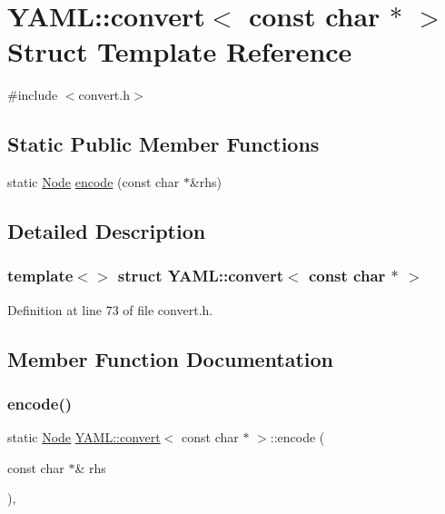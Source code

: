 \hypertarget{struct_y_a_m_l_1_1convert_3_01const_01char_01_5_01_4}{}\section{Y\+A\+ML\+::convert$<$ const char $\ast$ $>$ Struct Template Reference}
\label{struct_y_a_m_l_1_1convert_3_01const_01char_01_5_01_4}


{\ttfamily \#include $<$convert.\+h$>$}

\subsection*{Static Public Member Functions}
\begin{DoxyCompactItemize}
\item 
static \mbox{\hyperlink{class_y_a_m_l_1_1_node}{Node}} \mbox{\hyperlink{struct_y_a_m_l_1_1convert_3_01const_01char_01_5_01_4_ac71e377d0d029cf3fa77f7e8e382d123}{encode}} (const char $\ast$\&rhs)
\end{DoxyCompactItemize}


\subsection{Detailed Description}
\subsubsection*{template$<$$>$\newline
struct Y\+A\+M\+L\+::convert$<$ const char $\ast$ $>$}



Definition at line 73 of file convert.\+h.



\subsection{Member Function Documentation}
\mbox{\label{struct_y_a_m_l_1_1convert_3_01const_01char_01_5_01_4_ac71e377d0d029cf3fa77f7e8e382d123}} 
\subsubsection{\texorpdfstring{encode()}{encode()}}
{\footnotesize\ttfamily static \mbox{\hyperlink{class_y_a_m_l_1_1_node}{Node}} \mbox{\hyperlink{struct_y_a_m_l_1_1convert}{Y\+A\+M\+L\+::convert}}$<$ const char $\ast$ $>$\+::encode (\begin{DoxyParamCaption}\item[{const char $\ast$\&}]{rhs }\end{DoxyParamCaption})\hspace{0.3cm}{\ttfamily [inline]}, {\ttfamily [static]}}



